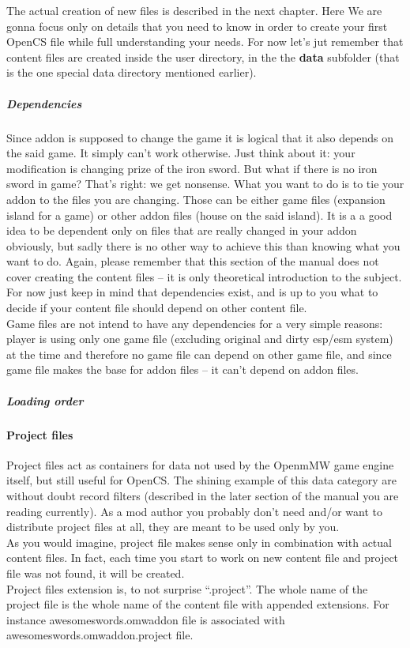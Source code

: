 The actual creation of new files is described in the next chapter. Here We are gonna focus only on details that you need to know in order to create your first Open{CS} file while full understanding your needs. For now let's jut remember that content files are created inside the user directory, in the the \textbf{data} subfolder (that is the one special data directory mentioned earlier).\\

\subparagraph{Dependencies}
Since addon is supposed to change the game it is logical that it also depends on the said game. It simply can't work otherwise. Just think about it: your modification is changing prize of the iron sword. But what if there is no iron sword in game? That's right: we get nonsense. What you want to do is to tie your addon to the files you are changing. Those can be either game files (expansion island for a game) or other addon files (house on the said island). It is a a good idea to be dependent only on files that are really changed in your addon obviously, but sadly there is no other way to achieve this than knowing what you want to do. Again, please remember that this section of the manual does not cover creating the content files -- it is only theoretical introduction to the subject. For now just keep in mind that dependencies exist, and is up to you what to decide if your content file should depend on other content file.\\

Game files are not intend to have any dependencies for a very simple reasons: player is using only one game file (excluding original and dirty esp/esm system) at the time and therefore no game file can depend on other game file, and since game file makes the base for addon files -- it can't depend on addon files.\\

\subparagraph{Loading order}

\paragraph{Project files}
Project files act as containers for data not used by the Openm{MW} game engine itself, but still useful for OpenCS. The shining example of this data category are without doubt record filters (described in the later section of the manual you are reading currently). As a mod author you probably don't need and/or want to distribute project files at all, they are meant to be used only by you.\\ 
As you would imagine, project file makes sense only in combination with actual content files. In fact, each time you start to work on new content file and project file was not found, it will be created.\\ 
Project files extension is, to not surprise ``.project''. The whole name of the project file is the whole name of the content file with appended extensions. For instance awesomeswords.omwaddon file is associated with awesomeswords.omwaddon.project file.\\

